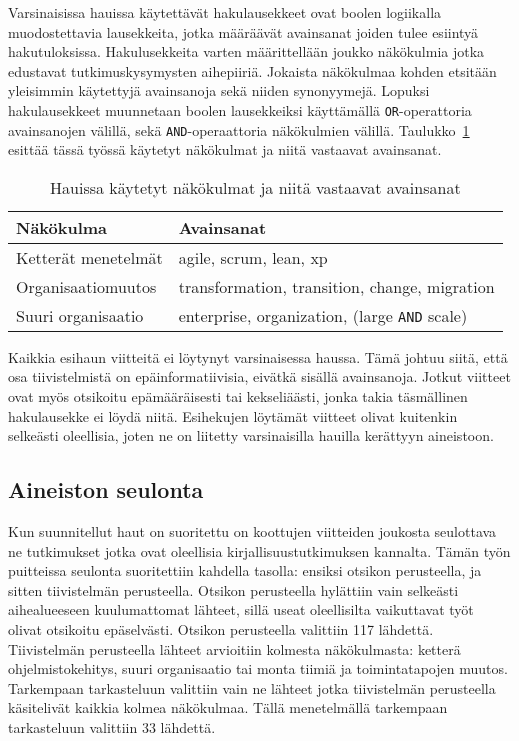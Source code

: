 Varsinaisissa hauissa käytettävät hakulausekkeet ovat boolen logiikalla
muodostettavia lausekkeita, jotka määräävät avainsanat joiden tulee esiintyä
hakutuloksissa. Hakulusekkeita varten määrittellään joukko näkökulmia jotka
edustavat tutkimuskysymysten aihepiiriä. Jokaista näkökulmaa kohden etsitään
yleisimmin käytettyjä avainsanoja sekä niiden synonyymejä. Lopuksi
hakulausekkeet muunnetaan boolen lausekkeiksi käyttämällä
\texttt{OR}-operattoria avainsanojen välillä, sekä \texttt{AND}-operaattoria
näkökulmien välillä. Taulukko~\ref{table:hakulausekkeet} esittää tässä työssä
käytetyt näkökulmat ja niitä vastaavat avainsanat.

\begin{table}
    \begin{tabular}{|l|l|}
        \hline
        Näkökulma           & Avainsanat   \\ \hline
        Ketterät menetelmät & agile, scrum, lean, xp \\ 
        Organisaatiomuutos  & transformation, transition, change, migration \\
        Suuri organisaatio  & enterprise, organization, (large \texttt{AND} scale) \\
        \hline
    \end{tabular}
	\caption{Hauissa käytetyt näkökulmat ja niitä vastaavat avainsanat}
	\label{table:hakulausekkeet}
\end{table}

Kaikkia esihaun viitteitä ei löytynyt varsinaisessa haussa. Tämä johtuu siitä,
että osa tiivistelmistä on epäinformatiivisia, eivätkä sisällä avainsanoja.
Jotkut viitteet ovat myös otsikoitu epämääräisesti tai kekseliäästi, jonka takia
täsmällinen hakulausekke ei löydä niitä. Esihekujen löytämät viitteet olivat
kuitenkin selkeästi oleellisia, joten ne on liitetty varsinaisilla hauilla
kerättyyn aineistoon.

\subsection{Aineiston seulonta}

Kun suunnitellut haut on suoritettu on koottujen viitteiden joukosta seulottava
ne tutkimukset jotka ovat oleellisia kirjallisuustutkimuksen kannalta. Tämän
työn puitteissa seulonta suoritettiin kahdella tasolla: ensiksi otsikon
perusteella, ja sitten tiivistelmän perusteella. Otsikon perusteella hylättiin
vain selkeästi aihealueeseen kuulumattomat lähteet, sillä useat oleellisilta
vaikuttavat työt olivat otsikoitu epäselvästi. Otsikon perusteella valittiin 117
lähdettä. Tiivistelmän perusteella lähteet arvioitiin kolmesta näkökulmasta:
ketterä ohjelmistokehitys, suuri organisaatio tai monta tiimiä ja
toimintatapojen muutos. Tarkempaan tarkasteluun valittiin vain ne lähteet jotka
tiivistelmän perusteella käsitelivät kaikkia kolmea näkökulmaa. Tällä
menetelmällä tarkempaan tarkasteluun valittiin 33 lähdettä.

